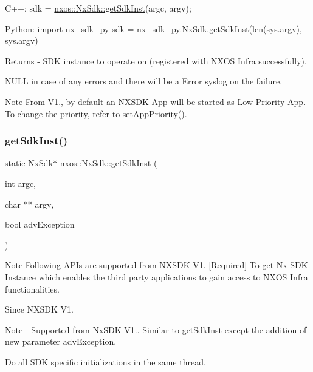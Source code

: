 \begin{DoxyCode}
C++:
     sdk = \mbox{\hyperlink{classnxos_1_1_nx_sdk_a5050e2d26c40744b4fc7862068a83f39}{nxos::NxSdk::getSdkInst}}(argc, argv);

Python:
     \textcolor{keyword}{import} nx\_sdk\_py
     sdk = nx\_sdk\_py.NxSdk.getSdkInst(len(sys.argv), sys.argv)
\end{DoxyCode}
 \begin{DoxyReturn}{Returns}
-\/ S\+DK instance to operate on (registered with N\+X\+OS Infra successfully).
\begin{DoxyItemize}
\item N\+U\+LL in case of any errors and there will be a Error syslog on the failure.
\end{DoxyItemize}
\end{DoxyReturn}
\begin{DoxyNote}{Note}
From V1., by default an N\+X\+S\+DK App will be started as Low Priority App. To change the priority, refer to \mbox{\hyperlink{classnxos_1_1_nx_sdk_a46d9487216506aa19e5499759f5eaef7}{set\+App\+Priority()}}. 
\end{DoxyNote}
\mbox{\label{classnxos_1_1_nx_sdk_acdeb12edbd291b5421ddb3260547bf8a}} 
\subsubsection{\texorpdfstring{get\+Sdk\+Inst()}{getSdkInst()}\hspace{0.1cm}{\footnotesize\ttfamily [2/4]}}
{\footnotesize\ttfamily static \mbox{\hyperlink{classnxos_1_1_nx_sdk}{Nx\+Sdk}}$\ast$ nxos\+::\+Nx\+Sdk\+::get\+Sdk\+Inst (\begin{DoxyParamCaption}\item[{int}]{argc,  }\item[{char $\ast$$\ast$}]{argv,  }\item[{bool}]{adv\+Exception }\end{DoxyParamCaption})\hspace{0.3cm}{\ttfamily [static]}}

\begin{DoxyNote}{Note}
Following A\+P\+Is are supported from N\+X\+S\+DK V1. \mbox{[}Required\mbox{]} To get Nx S\+DK Instance which enables the third party applications to gain access to N\+X\+OS Infra functionalities. 
\end{DoxyNote}
\begin{DoxySince}{Since}
N\+X\+S\+DK V1.
\end{DoxySince}
\begin{DoxyNote}{Note}
-\/ Supported from Nx\+S\+DK V1.. Similar to get\+Sdk\+Inst except the addition of new parameter adv\+Exception.
\begin{DoxyItemize}
\item Do all S\+DK specific initializations in the same thread.
\end{DoxyItemize}
\end{DoxyNote}

